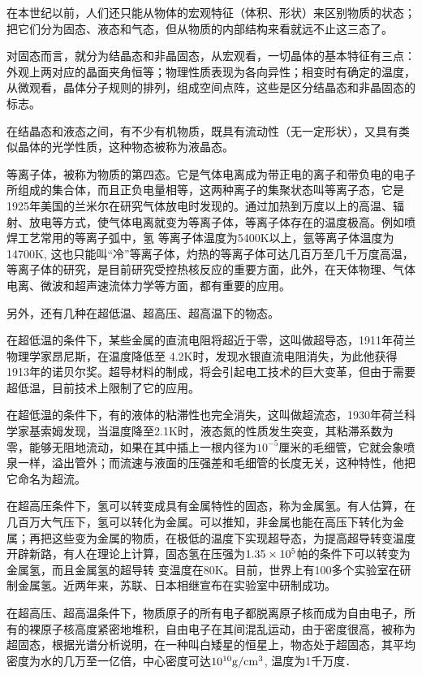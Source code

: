 在本世纪以前，人们还只能从物体的宏观特征（体积、形状）来区别物质的状态；把它们分为固态、液态和气态，但从物质的内部结构来看就远不止这三态了。

对固态而言，就分为结晶态和非晶固态，从宏观看，一切晶体的基本特征有三点：外观上两对应的晶面夹角恒等；物理性质表现为各向异性；相变时有确定的温度，从微观看，晶体分子规则的排列，组成空间点阵，这些是区分结晶态和非晶固态的标志。

在结晶态和液态之间，有不少有机物质，既具有流动性（无一定形状），又具有类似晶体的光学性质，这种物态被称为液晶态。

等离子体，被称为物质的第四态。它是气体电离成为带正电的离子和带负电的电子所组成的集合体，而且正负电量相等，这两种离子的集聚状态叫等离子态，它是1925年美国的兰米尔在研究气体放电时发现的。通过加热到万度以上的高温、辐射、放电等方式，使气体电离就变为等离子体，等离子体存在的温度极高。例如喷焊工艺常用的等离子弧中，氢
等离子体温度为5400K以上，氩等离子体温度为14700K, 这也只能叫“冷”等离子体，灼热的等离子体可达几百万至几千万度高温，等离子体的研究，是目前研究受控热核反应的重要方面，此外，在天体物理、气体电离、微波和超声速流体力学等方面，都有重要的应用。

另外，还有几种在超低温、超高压、超高温下的物态。

在超低温的条件下，某些金属的直流电阻将超近于零，这叫做超导态，1911年荷兰物理学家昂尼斯，在温度降低至
4.2K时，发现水银直流电阻消失，为此他获得1913年的诺贝尔奖。超导材料的制成，将会引起电工技术的巨大变革，但由于需要超低温，目前技术上限制了它的应用。

在超低温的条件下，有的液体的粘滞性也完全消失，这叫做超流态，1930年荷兰科学家基索姆发现，当温度降至2.1K时，液态氮的性质发生突变，其粘滞系数为零，能够无阻地流动，如果在其中插上一根内径为$10^{-5}$厘米的毛细管，它就会象喷泉一样，溢出管外；而流速与液面的压强差和毛细管的长度无关，这种特性，他把它命名为超流。

在超高压条件下，氢可以转变成具有金属特性的固态，称为金属氢。有人估算，在几百万大气压下，氢可以转化为金属。可以推知，非金属也能在高压下转化为金属；再把这些变为金属的物质，在极低的温度下实现超导态，为提高超导转变温度开辟新路，有人在理论上计算，固态氢在压强为$1. 35\times10^5$帕的条件下可以转变为金属氢，而且金属氢的超导转
变温度在80K。目前，世界上有100多个实验室在研制金属氢。近两年来，苏联、日本相继宣布在实验室中研制成功。

在超高压、超高温条件下，物质原子的所有电子都脱离原子核而成为自由电子，所有的裸原子核高度紧密地堆积，自由电子在其间混乱运动，由于密度很高，被称为超固态，根据光谱分析说明，在一种叫白矮星的恒星上，物态处于超固态，其平均密度为水的几万至一亿倍，中心密度可达$10^{10}{\rm g/cm^3}$, 温度为1千万度．

